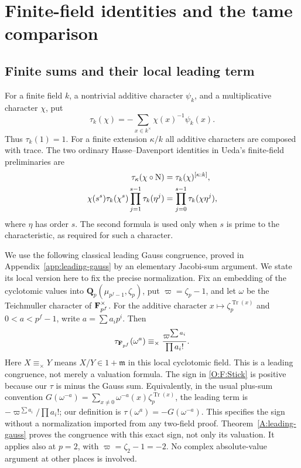 \documentclass[11pt]{amsart}
\theoremstyle{definition}
\theoremstyle{remark}
\newcommand{\Tr}{\operatorname{Tr}}
\newcommand{\Nm}{\operatorname{N}}
\begin{document}
\section{Finite-field identities and the tame comparison}\label{O:sec:tame}\label{sec:tame}
\subsection{Finite sums and their local leading term}
For a finite field $k$, a nontrivial additive character $\psi_k$, and a
multiplicative character $\chi$, put
\[
 \tau_k(\chi)=-\sum_{x\in k^\times}\chi(x)^{-1}\psi_k(x).
\]
Thus $\tau_k(1)=1$. For a finite extension $\kappa/k$ all additive
characters are composed with trace. The two ordinary
Hasse--Davenport identities in Ueda's finite-field preliminaries are
\begin{align}\label{O:F:HD}
 \tau_\kappa(\chi\circ\Nm)&=\tau_k(\chi)^{[\kappa:k]},\notag\\
 \chi(s^s)\tau_k(\chi^s)\prod_{j=1}^{s-1}\tau_k(\eta^j)
 &=\prod_{j=0}^{s-1}\tau_k(\chi\eta^j),
\end{align}
where $\eta$ has order $s$. The second formula is used only when
$s$ is prime to the characteristic, as required for such a character.

We use the following classical leading Gauss congruence, proved in
Appendix~\ref{app:leading-gauss} by an elementary Jacobi-sum argument.
We state its local version here to fix the precise normalization. Fix an
embedding of the cyclotomic values into
$\mathbf Q_p(\mu_{p^f-1},\zeta_p)$, put $\varpi=\zeta_p-1$, and
let $\omega$ be the Teichmuller character of $\mathbf F_{p^f}^\times$.
For the additive character $x\mapsto\zeta_p^{\Tr(x)}$ and
$0<a<p^f-1$, write $a=\sum a_i p^i$. Then
\begin{equation}\label{O:F:Stick}
 \tau_{\mathbf F_{p^f}}(\omega^a)
 \equiv_\times \frac{\varpi^{\sum a_i}}{\prod a_i!}.
\end{equation}
Here $X\equiv_\times Y$ means $X/Y\in1+\mathfrak m$ in this local
cyclotomic field. This is a leading congruence, not merely a valuation
formula. The sign in \eqref{O:F:Stick} is positive because our $\tau$ is
minus the Gauss sum. Equivalently, in the usual plus-sum convention
$G(\omega^{-a})=\sum_{x\ne0}\omega^{-a}(x)\zeta_p^{\Tr(x)}$, the leading
term is $-\varpi^{\sum a_i}/\prod a_i!$; our definition is
$\tau(\omega^a)=-G(\omega^{-a})$. This specifies the sign without a
normalization imported from any two-field proof.
Theorem~\ref{A:leading-gauss} proves the congruence with this exact
sign, not only its valuation. It applies also at $p=2$, with
$\varpi=\zeta_2-1=-2$. No complex absolute-value argument at other places
is involved.
\end{document}
